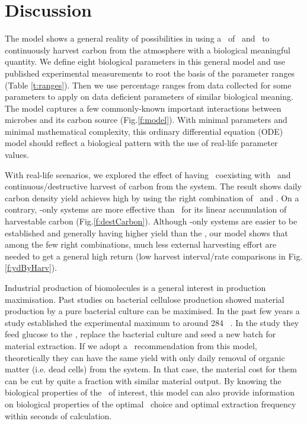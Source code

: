 \documentclass[../thesis.tex]{subfiles} %
\begin{document}
\section{Discussion}
The model shows a general reality of possibilities in using a \pbs\ of \bac\ and \phy\ to continuously harvest carbon from the atmosphere with a biological meaningful quantity.  We define eight biological parameters in this general model and use published experimental measurements to root the basis of the parameter ranges (Table \ref{t:ranges}).  Then we use percentage ranges from data collected for some parameters to apply on data deficient parameters of similar biological meaning.  The model captures a few commonly-known important interactions between microbes and its carbon source (Fig.\ref{f:model}).  With minimal parameters and minimal mathematical complexity, this ordinary differential equation (ODE) model should reflect a biological pattern with the use of real-life parameter values.

With real-life scenarios, we explored the effect of having \bac\ coexisting with \phy\ and continuous/destructive harvest of carbon from the system.  The result shows daily carbon density yield achieves high by using the right combination of \phy\ and \bac.  On a contrary, \phy-only systems are more effective than \pbs\ for its linear accumulation of harvestable carbon (Fig.\ref{f:destCarbon}).  Although \phy-only systems are easier to be established and generally having higher yield than the \pbs, our model shows that among the few right combinations, much less external harvesting effort are needed to get a general high return (low harvest interval/rate comparisons in Fig.\ref{f:ydByHarv}).

Industrial production of biomolecules is a general interest in production maximisation.  Past studies on bacterial cellulose production showed material production by a pure bacterial culture can be maximised.  In the past few years a study established the experimental maximum to around 284 \dxdt\ \autocite{aytekin2016statistical}.  In the study they feed glucose to the \bac, replace the bacterial culture and seed a new batch for material extraction.  If we adopt a \phy\ recommendation from this model, theoretically they can have the same yield with only daily removal of organic matter (i.e. dead cells) from the system.  In that case, the material cost for them can be cut by quite a fraction with similar material output.  By knowing the biological properties of the \bac\ of interest, this model can also provide information on biological properties of the optimal \phy\ choice and optimal extraction frequency within seconds of calculation.
\end{document}
